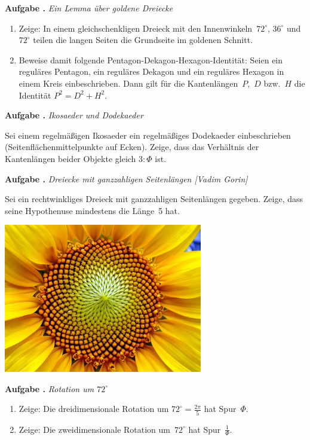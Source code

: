 \documentclass[a4paper,ngerman,twoside]{scrartcl}
\newlength{\aufgabenskip}
\newcounter{aufgabennummer}
\newenvironment{aufgabe}[1]{
  \addtocounter{aufgabennummer}{1}
  \textbf{Aufgabe \theaufgabennummer.} \emph{#1} \par
}{\vspace{\aufgabenskip}}
\begin{document}
\begin{aufgabe}{Ein Lemma über goldene Dreiecke}
\begin{enumerate}
\item Zeige: In einem gleichschenkligen Dreieck mit den
Innenwinkeln~$72^\circ$, $36^\circ$ und~$72^\circ$ teilen die langen Seiten die
Grundseite im goldenen Schnitt.
\item Beweise damit folgende Pentagon-Dekagon-Hexagon-Identität: Seien ein
reguläres Pentagon, ein reguläres Dekagon und ein reguläres Hexagon in einem
Kreis einbeschrieben. Dann gilt für die Kantenlängen~$P$,~$D$ bzw.~$H$ die
Identität $P^2 = D^2 + H^2$.
\end{enumerate}
\end{aufgabe}

\begin{aufgabe}{Ikosaeder und Dodekaeder}
Sei einem regelmäßigen Ikosaeder ein regelmäßiges Dodekaeder einbeschrieben
(Seitenflächenmittelpunkte auf Ecken). Zeige, dass das Verhältnis der Kantenlängen
beider Objekte gleich $3:\Phi$ ist.
\end{aufgabe}

\begin{aufgabe}{Dreiecke mit ganzzahligen Seitenlängen [Vadim Gorin]}
Sei ein rechtwinkliges Dreieck mit ganzzahligen Seitenlängen gegeben.
Zeige, dass seine Hypothenuse mindestens die Länge~5 hat.
\end{aufgabe}

\begin{center}\includegraphics[width=0.65\textwidth]{sonnenblume}\end{center}

\begin{aufgabe}{Rotation um $72^\circ$}
\begin{enumerate}
\item Zeige: Die dreidimensionale Rotation um $72^\circ = \frac{2\pi}{5}$ hat Spur~$\Phi$.
\item Zeige: Die zweidimensionale Rotation um~$72^\circ$ hat Spur~$\frac{1}{\Phi}$.
\end{enumerate}
\end{aufgabe}
\end{document}
